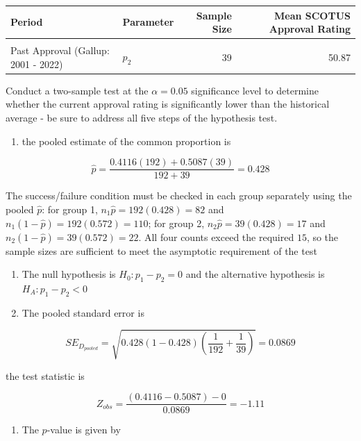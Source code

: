 \documentclass[
]{article}
\providecommand{\tightlist}{%
  \setlength{\itemsep}{0pt}\setlength{\parskip}{0pt}}
\begin{document}
\begin{table}[H]
\centering\centering
\begin{tabular}{llrr}
\toprule
Period & Parameter & Sample Size & Mean SCOTUS Approval Rating\\
\midrule
\cellcolor{gray!10}{Current Approval (2022 - 2024)} & \cellcolor{gray!10}{$p_1$} & \cellcolor{gray!10}{192} & \cellcolor{gray!10}{41.16}\\
Past Approval (Gallup: 2001 - 2022) & $p_2$ & 39 & 50.87\\
\bottomrule
\end{tabular}
\end{table}

Conduct a two-sample test at the \(\alpha = 0.05\) significance level to
determine whether the current approval rating is significantly lower
than the historical average - be sure to address all five steps of the
hypothesis test.

\begin{enumerate}
\def\labelenumi{\arabic{enumi}.}
\tightlist
\item
  the pooled estimate of the common proportion is
\end{enumerate}

\[\hat{p} = \frac{0.4116(192)+0.5087(39)}{192+39} = 0.428\]

The success/failure condition must be checked in each group separately
using the pooled \(\hat{p}\): for group 1,
\(n_1\hat{p} = 192(0.428) = 82\) and
\(n_1(1-\hat{p}) = 192(0.572) = 110\); for group 2,
\(n_2\hat{p} = 39(0.428) = 17\) and \(n_2(1-\hat{p}) = 39(0.572) = 22\).
All four counts exceed the required \(15\), so the sample sizes are
sufficient to meet the asymptotic requirement of the test

\begin{enumerate}
\def\labelenumi{\arabic{enumi}.}
\setcounter{enumi}{1}
\item
  {The null hypothesis is \(H_0: p_1 - p_2 = 0\) and the alternative
  hypothesis is \(H_A: p_1 - p_2 < 0\)}
\item
  The pooled standard error is
\end{enumerate}

\[SE_{D_{pooled}} =  \sqrt{0.428(1-0.428)\left(\frac{1}{192}+\frac{1}{39}\right)} = 0.0869\]

the test statistic is

\[ Z_{obs} = \frac{(0.4116 - 0.5087)-0}{0.0869} = -1.11\]

\begin{enumerate}
\def\labelenumi{\arabic{enumi}.}
\setcounter{enumi}{3}
\tightlist
\item
  The \(p\)-value is given by
\end{enumerate}
\end{document}
